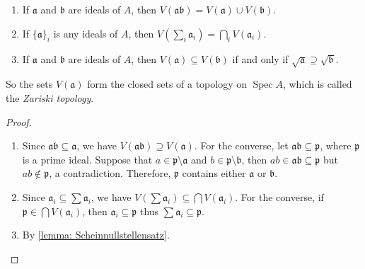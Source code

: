 \documentclass[11pt]{article}
\newcommand{\Spec}{\operatorname{Spec}}
\begin{document}
\begin{lemma}
    \cite[Lemma II.2.1]{hartsAG}
    \begin{enumerate}[label = (\alph*)]
        \item If $ \mathfrak{a} $ and $ \mathfrak{b} $ are ideals of $ A $, then 
            $ V(\mathfrak{ab})=V(\mathfrak{a}) \cup V(\mathfrak{b}) $. 
        \item If $ \{\mathfrak{a}\}_{i} $ is any ideals of $ A $, then 
            $ V(\sum_{i}\mathfrak{a}_{i}) = \bigcap_{i}V(\mathfrak{a}_{i}) $. 
        \item If $ \mathfrak{a} $ and $ \mathfrak{b} $ are ideals of $ A $, then 
            $ V(\mathfrak{a}) \subseteq V(\mathfrak{b}) $ if and only if 
            $ \sqrt{\mathfrak{a}} \supseteq \sqrt{\mathfrak{b}}$. 
    \end{enumerate}

    So the sets $ V(\mathfrak{a}) $ form the closed sets of a topology on $ \Spec A $, 
    which is called the \emph{Zariski topology}.
\end{lemma}

\begin{proof}
    \begin{enumerate}[label = (\alph*)]
        \item Since $ \mathfrak{ab} \subseteq \mathfrak{a} $, we have $ V(\mathfrak{ab}) \supseteq V(\mathfrak{a}) $. 
            For the converse, let $ \mathfrak{ab} \subseteq \mathfrak{p} $, where $ \mathfrak{p} $ 
            is a prime ideal. Suppose that $ a \in \mathfrak{p} \setminus \mathfrak{a} $ and 
            $ b \in \mathfrak{p} \setminus \mathfrak{b} $, then $ ab \in \mathfrak{ab} \subseteq \mathfrak{p} $ 
            but $ ab \notin \mathfrak{p} $, a contradiction. 
            Therefore, $ \mathfrak{p} $ contains either $ \mathfrak{a} $ or $ \mathfrak{b} $. 

        \item Since $ \mathfrak{a}_{i} \subseteq \sum \mathfrak{a}_{i} $, 
            we have $ V(\sum \mathfrak{a}_{i}) \subseteq \bigcap V(\mathfrak{a}_{i}) $. 
            For the converse, if $ \mathfrak{p} \in \bigcap V(\mathfrak{a}_{i}) $, 
            then $ \mathfrak{a}_{i} \subseteq \mathfrak{p} $ thus $ \sum \mathfrak{a}_{i} \subseteq \mathfrak{p} $. 

        \item By \autoref{lemma: Scheinnullstellensatz}. 
    \end{enumerate}
\end{proof}
\end{document}
